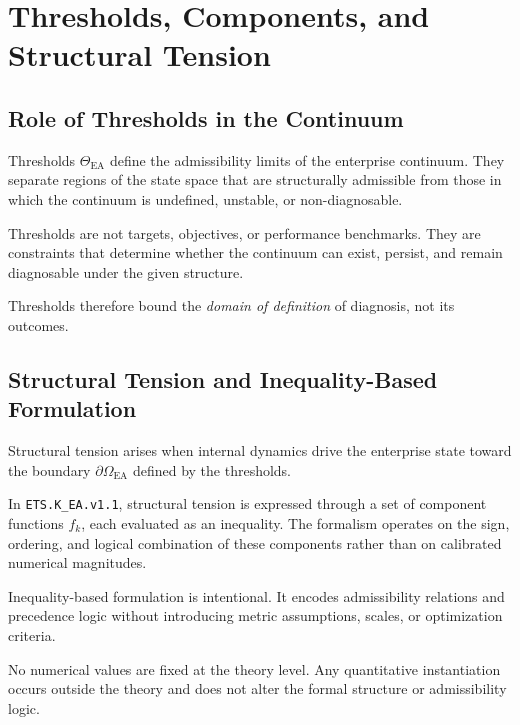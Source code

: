 
\section{Thresholds, Components, and Structural Tension}

\subsection{Role of Thresholds in the Continuum}

Thresholds $\Theta_{\mathrm{EA}}$ define the admissibility limits of the
enterprise continuum.
They separate regions of the state space that are structurally
admissible from those in which the continuum is undefined, unstable, or
non-diagnosable.

Thresholds are not targets, objectives, or performance benchmarks.
They are constraints that determine whether the continuum can exist,
persist, and remain diagnosable under the given structure.

Thresholds therefore bound the \emph{domain of definition} of diagnosis,
not its outcomes.

\subsection{Structural Tension and Inequality-Based Formulation}

Structural tension arises when internal dynamics drive the enterprise
state toward the boundary $\partial\Omega_{\mathrm{EA}}$ defined by the
thresholds.

In \texttt{ETS.K\_EA.v1.1}, structural tension is expressed through a set
of component functions $f_k$, each evaluated as an inequality.
The formalism operates on the sign, ordering, and logical combination of
these components rather than on calibrated numerical magnitudes.

Inequality-based formulation is intentional.
It encodes admissibility relations and precedence logic without
introducing metric assumptions, scales, or optimization criteria.

No numerical values are fixed at the theory level.
Any quantitative instantiation occurs outside the theory and does not
alter the formal structure or admissibility logic.

